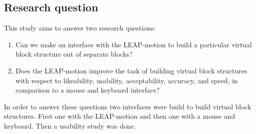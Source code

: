 \subsection{Research question}
This study aims to answer two research questions:
\begin{enumerate}
\item Can we make an interface with the LEAP-motion to build a particular virtual block structure out of separate blocks?
\item Does the LEAP-motion improve the task of building virtual block structures with respect to likeability, usability, acceptability, accuracy, and speed, in comparison to a mouse and keyboard interface?
\end{enumerate}
In order to answer these questions two interfaces were build to build virtual block structures. First one with the LEAP-motion and then one with a mouse and keyboard. Then a usability study was done.